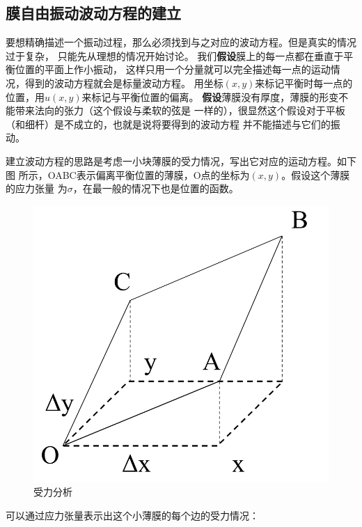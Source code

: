 \documentclass[a4paper]{ctexart}
\begin{document}
	\subsection{膜自由振动波动方程的建立}
	要想精确描述一个振动过程，那么必须找到与之对应的波动方程。但是真实的情况过于复杂，
	只能先从理想的情况开始讨论。
	我们\textbf{假设}膜上的每一点都在垂直于平衡位置的平面上作小振动，
	这样只用一个分量就可以完全描述每一点的运动情况，得到的波动方程就会是标量波动方程。
	用坐标$(x, y)$来标记平衡时每一点的位置，用$u(x, y)$来标记与平衡位置的偏离。
	\textbf{假设}薄膜没有厚度，薄膜的形变不能带来法向的张力（这个假设与柔软的弦是
	一样的），很显然这个假设对于平板（和细杆）是不成立的，也就是说将要得到的波动方程
	并不能描述与它们的振动。
	\par 建立波动方程的思路是考虑一小块薄膜的受力情况，写出它对应的运动方程。如下图
	所示，OABC表示偏离平衡位置的薄膜，O点的坐标为$(x, y)$。假设这个薄膜的应力张量
	为$\sigma$，在最一般的情况下也是位置的函数。
	\begin{figure}[htbp]
		\centering
		\includegraphics[scale=0.2]{force.png}
		\caption{受力分析}
	\end{figure} 
	可以通过应力张量表示出这个小薄膜的每个边的受力情况：
\end{document}
